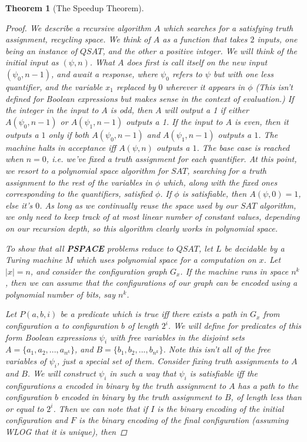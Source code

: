 \documentclass{article}
\theoremstyle{definition}
\theoremstyle{plain}
\theoremstyle{theorem}
\newtheorem{theorem}{Theorem}[section]
\begin{document}
\begin{theorem}[The Speedup Theorem]
\begin{proof}
    We describe a recursive algorithm $A$ which searches for a satisfying truth assignment, recycling space. We think of $A$ as a function that takes $2$ inputs, one being an instance of $QSAT$, and the other a positive integer. We will think of the initial input as $(\psi,n)$. What $A$ does first is call itself on the new input $(\psi_0,n-1)$, and await a response, where $\psi_0$ refers to $\psi$ but with one less quantifier, and the variable $x_1$ replaced by $0$ wherever it appears in $\phi$ (This isn't defined for Boolean expressions but makes sense in the context of evaluation.) If the integer in the input to $A$ is odd, then $A$ will output a 1 if either $A(\psi_0,n-1)$ or $A(\psi_1,n-1)$ outputs a 1. If the input to $A$ is even, then it outputs a $1$ only if both $A(\psi_0,n-1)$ and $A(\psi_1,n-1)$ outputs a $1$. The machine halts in acceptance iff $A(\psi,n)$ outputs a $1$. The base case is reached when $n=0$, i.e. we've fixed a truth assignment for each quantifier. At this point, we resort to a polynomial space algorithm for $SAT$, searching for a truth assignment to the rest of the variables in $\phi$ which, along with the fixed ones corresponding to the quantifiers, satisfied $\phi$. If $\phi$ is satisfiable, then $A(\psi,0) = 1$, else it's $0$. As long as we continually reuse the space used by our $SAT$ algorithm, we only need to keep track of at most linear number of constant values, depending on our recursion depth, so this algorithm clearly works in polynomial space.
    \par To show that all \textbf{PSPACE} problems reduce to $QSAT$, let $L$ be decidable by a Turing machine $M$ which uses polynomial space for a computation on $x$. Let $|x|=n$, and consider the configuration graph $G_x$. If the machine runs in space $n^k$, then we can assume that the configurations of our graph can be encoded using a polynomial number of bits, say $n^k$.
    \par Let $P(a,b,i)$ be a predicate which is true iff there exists a path in $G_x$ from configuration $a$ to configuration $b$ of length $2^i$. We will define for predicates of this form Boolean expressions $\psi_i$ with free variables in the disjoint sets $A = \{a_1,a_2,...,a_{n^k}\}$, and $B = \{b_1,b_2,...,b_{n^k}\}$. Note this isn't all of the free variables of $\psi_i$, just a special set of them. Consider fixing truth assignments to $A$ and $B$. We will construct $\psi_i$ in such a way that $\psi_i$ is satisfiable iff the configurations $a$ encoded in binary by the truth assignment to $A$ has a path to the configuration $b$ encoded in binary by the truth assignment to $B$, of length less than or equal to $2^i$. Then we can note that if $I$ is the binary encoding of the initial configuration and $F$ is the binary encoding of the final configuration (assuming WLOG that it is unique), then 

\end{proof}
\end{theorem}
\end{document}
